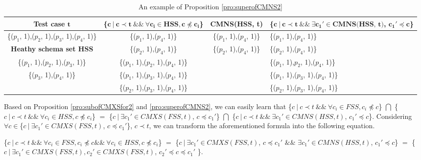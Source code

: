\documentclass{sig-alternate-05-2015}
\begin{document}
{\begin{table}[ht]
  \centering
  \setlength{\tabcolsep}{2pt}
  \caption{An example of Proposition \ref{pro:superofCMNS2}}
    \begin{tabular}{|c|c|c|C{5cm}|}
    \hline
  \textbf{  Test case $\textbf{t}$} & \textbf{ \{$\textbf{c}\ |\ \textbf{c} \prec \textbf{t}\ \&\&\ \forall \textbf{c}_{\textbf{i}} \in \textbf{HSS}, \textbf{c} \npreceq \textbf{c}_{\textbf{i}} $\} }& \textbf{  CMNS(HSS, t)} & \textbf{\{$ \textbf{c}\ |\ \textbf{c} \prec \textbf{t} \ \&\& \ \exists \textbf{c}_{\textbf{1}}' \in \textbf{CMNS(HSS, t)}$, $\textbf{c}_{\textbf{1}}' \preceq \textbf{c}$\}}\\\hline
    \{($p_{1}$, 1),($p_{2}$, 1),($p_{3}$, 1),($p_{4}$, 1)\}  & \{($p_{1}$, 1),($p_{4}$, 1)\} & \{($p_{1}$, 1),($p_{4}$, 1)\} & \{($p_{1}$, 1),($p_{4}$, 1)\}\\ 
      \textbf{Heathy schema set HSS}  & \{($p_{2}$, 1),($p_{4}$, 1)\} & \{($p_{2}$, 1),($p_{4}$, 1)\} & \{($p_{2}$, 1),($p_{4}$, 1)\} \\
     \{($p_{1}$, 1),($p_{2}$, 1),($p_{3}$, 1)\}         &\{($p_{1}$, 1),($p_{2}$, 1),($p_{4}$, 1)\}  &  &  \{($p_{1}$, 1),$p_{2}$, 1),($p_{4}$, 1)\}   \\
     \{($p_{3}$, 1),($p_{4}$, 1)\}         &\{($p_{1}$, 1),($p_{3}$, 1),($p_{4}$, 1)\}    &  &  \{($p_{1}$, 1),($p_{3}$, 1),($p_{4}$, 1)\}  \\
                         &\{($p_{2}$, 1),($p_{3}$, 1),($p_{4}$, 1)\}   &  & \{($p_{2}$, 1),($p_{3}$, 1),($p_{4}$, 1)\}   \\ \hline
    \end{tabular}%
  \label{examleOfCMNSPro2}%
\end{table}%


Based on Proposition \ref{pro:subofCMXSfor2} and \ref{pro:superofCMNS2}, we can easily learn that \{$c\ |\ c \prec t\ \&\&\ \forall c_{i} \in FSS, c_{i} \npreceq c $\} $\bigcap$ \{$c\ |\ c \prec t\ \&\&\ \forall c_{i} \in HSS, c \npreceq c_{i} $\}  $=$  \{$ c\ |\ \exists c_{1}' \in CMXS(FSS, t)$, $c \preceq c_{1}'$\} $\bigcap$  \{$ c\ |\ c \prec t \ \&\& \ \exists c_{1}' \in CMNS(HSS, t)$, $c_{1}' \preceq c$\}. Considering $\forall c \in $\{$ c\ |\ \exists c_{1}' \in CMXS(FSS, t)$, $c \preceq c_{1}'$\}, $c \prec t$, we can transform the aforementioned formula into the following equation.

\{$c\ |\ c \prec t\ \&\&\ \forall c_{i} \in FSS, c _{i} \npreceq c \&\&\ \forall c_{i} \in HSS, c \npreceq c_{i}  $\} $=$  \{$ c\ |\ \exists c_{1}' \in CMXS(FSS, t)$, $c \preceq c_{1}'$ $\&\&$ $\exists c_{1}' \in CMNS(HSS, t)$, $c_{1}' \preceq c$\} $=$  \{$ c\ |\ \exists c_{1}' \in CMXS(FSS, t), c_{2}' \in CMXS(FSS, t)$, $c_{2}' \preceq c \preceq c_{1}'$ \}.

}
\end{document}
